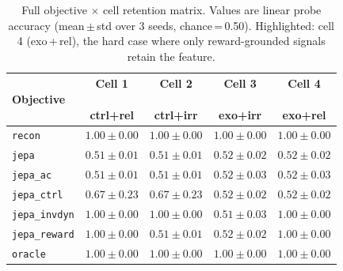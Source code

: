 \begin{table}[t]
\centering
\caption{Full objective $\times$ cell retention matrix. Values are linear probe accuracy (mean\,$\pm$\,std over 3 seeds, chance\,=\,0.50). Highlighted: cell 4 (exo\,+\,rel), the hard case where only reward-grounded signals retain the feature.}
\label{tab:quadrant_matrix}
\begin{tabular}{lcccc}
\toprule
\textbf{Objective} & \makecell{\textbf{Cell 1}\\\\\textbf{ctrl+rel}} & \makecell{\textbf{Cell 2}\\\\\textbf{ctrl+irr}} & \makecell{\textbf{Cell 3}\\\\\textbf{exo+irr}} & \makecell{\textbf{Cell 4}\\\\\textbf{exo+rel}} \\
\midrule
  \texttt{recon} & $1.00 \pm 0.00$ & $1.00 \pm 0.00$ & $1.00 \pm 0.00$ & $1.00 \pm 0.00$ \\
  \texttt{jepa} & $0.51 \pm 0.01$ & $0.51 \pm 0.01$ & $0.52 \pm 0.02$ & $0.52 \pm 0.02$ \\
  \texttt{jepa\_ac} & $0.51 \pm 0.01$ & $0.51 \pm 0.01$ & $0.52 \pm 0.03$ & $0.52 \pm 0.03$ \\
  \texttt{jepa\_ctrl} & $0.67 \pm 0.23$ & $0.67 \pm 0.23$ & $0.52 \pm 0.02$ & $0.52 \pm 0.02$ \\
  \texttt{jepa\_invdyn} & $1.00 \pm 0.00$ & $1.00 \pm 0.00$ & $0.51 \pm 0.03$ & $1.00 \pm 0.00$ \\
  \texttt{jepa\_reward} & $1.00 \pm 0.00$ & $0.51 \pm 0.01$ & $0.52 \pm 0.02$ & $1.00 \pm 0.00$ \\
  \texttt{oracle} & $1.00 \pm 0.00$ & $1.00 \pm 0.00$ & $1.00 \pm 0.00$ & $1.00 \pm 0.00$ \\
\bottomrule
\end{tabular}
\end{table}